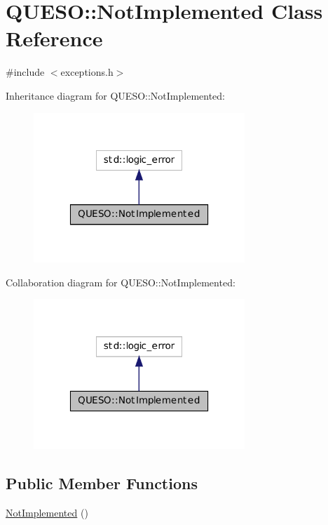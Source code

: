 \hypertarget{class_q_u_e_s_o_1_1_not_implemented}{\section{Q\-U\-E\-S\-O\-:\-:Not\-Implemented Class Reference}
\label{class_q_u_e_s_o_1_1_not_implemented}
}


{\ttfamily \#include $<$exceptions.\-h$>$}



Inheritance diagram for Q\-U\-E\-S\-O\-:\-:Not\-Implemented\-:
\nopagebreak
\begin{figure}[H]
\begin{center}
\leavevmode
\includegraphics[width=226pt]{class_q_u_e_s_o_1_1_not_implemented__inherit__graph}
\end{center}
\end{figure}


Collaboration diagram for Q\-U\-E\-S\-O\-:\-:Not\-Implemented\-:
\nopagebreak
\begin{figure}[H]
\begin{center}
\leavevmode
\includegraphics[width=226pt]{class_q_u_e_s_o_1_1_not_implemented__coll__graph}
\end{center}
\end{figure}
\subsection*{Public Member Functions}
\begin{DoxyCompactItemize}
\item 
\hyperlink{class_q_u_e_s_o_1_1_not_implemented_aea10d6f15b473c4b9dcb865834c1af23}{Not\-Implemented} ()
\end{DoxyCompactItemize}


